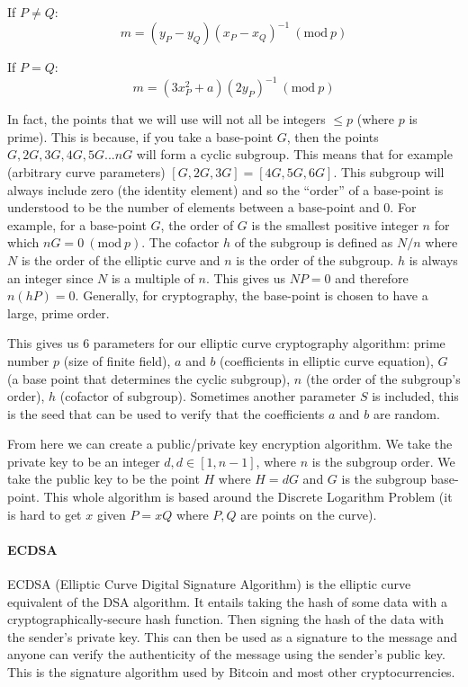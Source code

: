 \documentclass{article}
\begin{document}
If $P\not=Q$:
\[m = (y_P-y_Q)(x_P-x_Q)^{-1}\ (\textrm{mod}\ p)\]

If $P=Q$:
\[m = (3x_P^2 + a)(2y_P)^{-1}\ (\textrm{mod}\ p)\]

In fact, the points that we will use will not all be integers $\leq p$ (where $p$ is prime). This is because, if you take a base-point $G$, then the points $G, 2G, 3G, 4G, 5G... nG$ will form a cyclic subgroup. This means that for example (arbitrary curve parameters) $[G, 2G, 3G]=[4G, 5G, 6G]$. This subgroup will always include zero (the identity element) and so the ``order'' of a base-point is understood to be the number of elements between a base-point and 0. For example, for a base-point $G$, the order of $G$ is the smallest positive integer $n$ for which $nG = 0\ (\textrm{mod}\ p)$. The cofactor $h$ of the subgroup is defined as $N/n$ where $N$ is the order of the elliptic curve and $n$ is the order of the subgroup. $h$ is always an integer since $N$ is a multiple of $n$. This gives us $NP=0$ and therefore $n(hP)=0$. Generally, for cryptography, the base-point is chosen to have a large, prime order.

This gives us 6 parameters for our elliptic curve cryptography algorithm: prime number $p$ (size of finite field), $a$ and $b$ (coefficients in elliptic curve equation), $G$ (a base point that determines the cyclic subgroup), $n$ (the order of the subgroup's order), $h$ (cofactor of subgroup). Sometimes another parameter $S$ is included, this is the seed that can be used to verify that the coefficients $a$ and $b$ are random.

From here we can create a public/private key encryption algorithm. We take the private key to be an integer $d, d \in [1,n-1]$, where $n$ is the subgroup order. We take the public key to be the point $H$ where $H=dG$ and $G$ is the subgroup base-point. This whole algorithm is based around the Discrete Logarithm Problem (it is hard to get $x$ given $P=xQ$ where $P,Q$ are points on the curve).

\paragraph{ECDSA}
ECDSA (Elliptic Curve Digital Signature Algorithm) is the elliptic curve equivalent of the DSA algorithm. It entails taking the hash of some data with a cryptographically-secure hash function. Then signing the hash of the data with the sender's private key. This can then be used as a signature to the message and anyone can verify the authenticity of the message using the sender's public key. This is the signature algorithm used by Bitcoin and most other cryptocurrencies.
\end{document}
